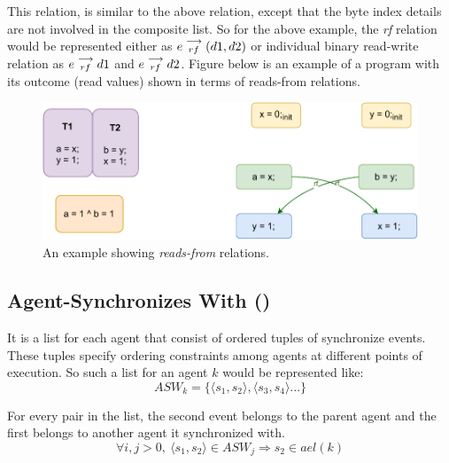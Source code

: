             This relation, is similar to the above relation, except that the byte index details are not involved in the composite list. So for the above example, the \textit{rf} relation would be represented either as   
                $e\stackrel{\longrightarrow}{_{rf}}(d1, d2)$
            or individual binary read-write relation as 
                $e\stackrel{\longrightarrow}{_{rf}}d1$ and $e\stackrel{\longrightarrow}{_{rf}}d2$.
            Figure below is an example of a program with its outcome (read values) shown in terms of reads-from relations. 
            \begin{figure}[H]
                \centering
                \includegraphics[scale=0.7]{4.ECMAScriptMemoryModel/ReadsFrom.pdf}
                \caption{An example showing \textit{reads-from} relations.}
                \label{read-from}
            \end{figure}
            
        \subsection{Agent-Synchronizes With ()}
        
            It is a list for each agent that consist of ordered tuples of synchronize events. These tuples specify ordering constraints among agents at different points of execution. So such a list for an agent $k$ would be represented like:  
                \[ASW_k = \{ \langle s_1, s_2 \rangle, \langle s_3, s_4 \rangle ...\}\]
        
            For every pair in the list, the second event belongs to the parent agent and the first belongs to another agent it synchronized with\footnotemark.
                \[  
                    \forall{i,j>0},\ 
                    \langle s_1, s_2 \rangle \in ASW_j 
                    \Rightarrow{} 
                    s_2 \in ael(k)                        
                \]


